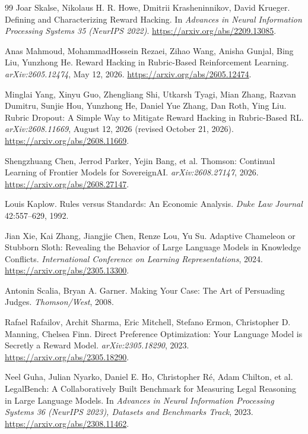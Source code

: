 \documentclass[11pt]{article}
\begin{document}
\begin{thebibliography}{99}
 Joar Skalse, Nikolaus H. R. Howe, Dmitrii Krasheninnikov, David Krueger. Defining and Characterizing Reward Hacking. In \emph{Advances in Neural Information Processing Systems 35 (NeurIPS 2022)}. \url{https://arxiv.org/abs/2209.13085}.

 Anas Mahmoud, MohammadHossein Rezaei, Zihao Wang, Anisha Gunjal, Bing Liu, Yunzhong He. Reward Hacking in Rubric-Based Reinforcement Learning. \emph{arXiv:2605.12474}, May 12, 2026. \url{https://arxiv.org/abs/2605.12474}.

 Minglai Yang, Xinyu Guo, Zhengliang Shi, Utkarsh Tyagi, Mian Zhang, Razvan Dumitru, Sunjie Hou, Yunzhong He, Daniel Yue Zhang, Dan Roth, Ying Liu. Rubric Dropout: A Simple Way to Mitigate Reward Hacking in Rubric-Based RL. \emph{arXiv:2608.11669}, August 12, 2026 (revised October 21, 2026). \url{https://arxiv.org/abs/2608.11669}.

 Shengzhuang Chen, Jerrod Parker, Yejin Bang, et al. Thomson: Continual Learning of Frontier Models for SovereignAI. \emph{arXiv:2608.27147}, 2026. \url{https://arxiv.org/abs/2608.27147}.

 Louis Kaplow. Rules versus Standards: An Economic Analysis. \emph{Duke Law Journal} 42:557--629, 1992.

 Jian Xie, Kai Zhang, Jiangjie Chen, Renze Lou, Yu Su. Adaptive Chameleon or Stubborn Sloth: Revealing the Behavior of Large Language Models in Knowledge Conflicts. \emph{International Conference on Learning Representations}, 2024. \url{https://arxiv.org/abs/2305.13300}.

 Antonin Scalia, Bryan A. Garner. Making Your Case: The Art of Persuading Judges. \emph{Thomson/West}, 2008.

 Rafael Rafailov, Archit Sharma, Eric Mitchell, Stefano Ermon, Christopher D. Manning, Chelsea Finn. Direct Preference Optimization: Your Language Model is Secretly a Reward Model. \emph{arXiv:2305.18290}, 2023. \url{https://arxiv.org/abs/2305.18290}.

 Neel Guha, Julian Nyarko, Daniel E. Ho, Christopher R\'e, Adam Chilton, et al. LegalBench: A Collaboratively Built Benchmark for Measuring Legal Reasoning in Large Language Models. In \emph{Advances in Neural Information Processing Systems 36 (NeurIPS 2023), Datasets and Benchmarks Track}, 2023. \url{https://arxiv.org/abs/2308.11462}.


\end{thebibliography}
\end{document}
